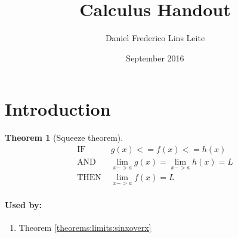 \documentclass{article}
\title{Calculus Handout}
\author{Daniel Frederico Lins Leite}
\date{September 2016}
\newtheorem{theorem}{Theorem}[section]
\theoremstyle{definition}
\begin{document}
\section{Introduction}
\maketitle

\begin{theorem}[Squeeze theorem]\label{theorems:limits:squeeze}
	\begin{align*}
		\text{IF }& g(x) <= f(x) <= h(x)\\
		\text{AND }& \lim_{x->a} {g(x)} = \lim_{x->a} {h(x)} = L\\
		\text{THEN }& \lim_{x->a} {f(x)} = L
	\end{align*}
\end{theorem}
\paragraph{Used by:}
\begin{enumerate}
	\item {Theorem \ref{theorems:limits:sinxoverx}}
\end{enumerate}
\end{document}
